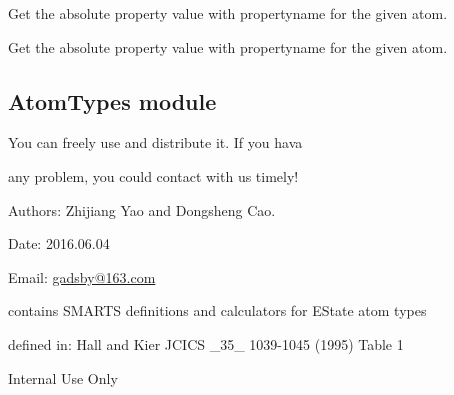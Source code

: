 \documentclass[letterpaper,10pt,english]{sphinxmanual}
\begin{document}
\begin{fulllineitems}
\label{reference/AtomProperty:AtomProperty.GetAbsoluteAtomicProperty}
Get the absolute property value with propertyname for the given atom.

\end{fulllineitems}


\begin{fulllineitems}
\label{reference/AtomProperty:AtomProperty.GetRelativeAtomicProperty}
Get the absolute property value with propertyname for the given atom.

\end{fulllineitems}



\subsection{AtomTypes module}
\label{reference/AtomTypes:atomtypes-module}\label{reference/AtomTypes::doc}\label{reference/AtomTypes:module-AtomTypes}
You can freely use and distribute it. If you hava

any problem, you could contact with us timely!

Authors: Zhijiang Yao and Dongsheng Cao.

Date: 2016.06.04

Email: \href{mailto:gadsby@163.com}{gadsby@163.com}

contains SMARTS definitions and calculators for EState atom types

defined in: Hall and Kier JCICS \_35\_ 1039-1045 (1995)  Table 1

\begin{fulllineitems}
\label{reference/AtomTypes:AtomTypes.BuildPatts}
Internal Use Only

\end{fulllineitems}

\end{document}
